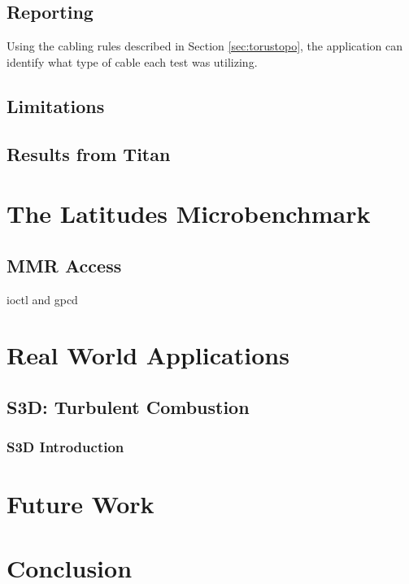 \documentclass[10pt, conference, compsocconf]{IEEEtran}
\begin{document}
\subsection{Reporting}

Using the cabling rules described in Section \ref{sec:torustopo}, the application can identify what type of cable each test was utilizing.

\subsection{Limitations}

\subsection{Results from Titan}

\section{The Latitudes Microbenchmark}

\subsection{MMR Access}
ioctl and gpcd


\section{Real World Applications}

\subsection{S3D: Turbulent Combustion}

\subsubsection{S3D Introduction}



\section{Future Work}

\section{Conclusion}

\end{document}
